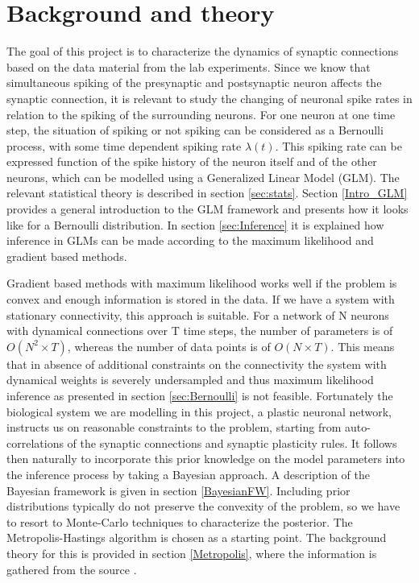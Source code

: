 
\chapter{Background and theory}
\label{ch:theory}

The goal of this project is to characterize the dynamics of synaptic connections based on the data material from the lab experiments. Since we know that simultaneous spiking of the presynaptic and postsynaptic neuron affects the synaptic connection, it is relevant to study the changing of neuronal spike rates in relation to the spiking of the surrounding neurons. For one neuron at one time step, the situation of spiking or not spiking can be considered as a Bernoulli process, with some time dependent spiking rate $\lambda (t)$. This spiking rate can be expressed function of the spike history of the neuron itself and of the other neurons, which can be modelled using a Generalized Linear Model (GLM). The relevant statistical theory is described in section \ref{sec:stats}. Section \ref{Intro_GLM} provides a general introduction to the GLM framework and presents how it looks like for a Bernoulli distribution. In section \ref{sec:Inference} it is explained how inference in GLMs can be made according to the maximum likelihood and gradient based methods. 

Gradient based methods with maximum likelihood works well if the problem is convex and enough information is stored in the data. If we have a system with stationary connectivity, this approach is suitable. For a network of N neurons with dynamical connections over T time steps, the number of parameters is of $O(N^2 \times T)$, whereas the number of data points is of $O(N \times T)$. This means that in absence of additional constraints on the connectivity the system with dynamical weights is severely undersampled and thus maximum likelihood inference as presented in section \ref{sec:Bernoulli} is not feasible. Fortunately the biological system we are modelling in this project, a plastic neuronal network, instructs us on reasonable constraints to the problem, starting from auto-correlations of the synaptic connections and synaptic plasticity rules. It follows then naturally to incorporate this prior knowledge on the model parameters into the inference process by taking a Bayesian approach. A description of the Bayesian framework is given in section \ref{BayesianFW}. Including prior distributions typically do not preserve the convexity of the problem, so we have to resort to Monte-Carlo techniques to characterize the posterior. The Metropolis-Hastings algorithm is chosen as a starting point. The background theory for this is provided in section \ref{Metropolis}, where the information is gathered from the source \cite{MC}.


